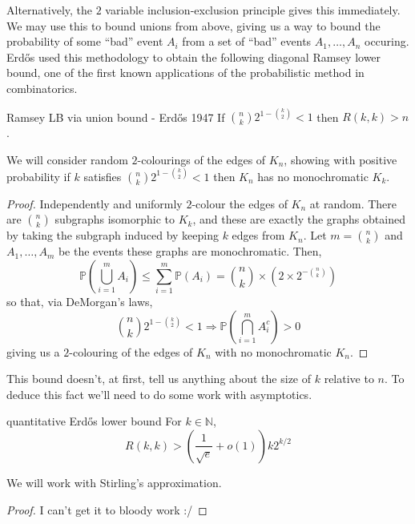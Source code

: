 \documentclass{article}
\begin{document}
Alternatively, the $2$ variable inclusion-exclusion principle gives this immediately. \\ 

We may use this to bound unions from above, giving us a way to bound the probability of some ``bad'' event 
$A_i$ from a set of ``bad'' events $A_1, \dots, A_n$ occuring. Erd\H{o}s used this methodology to obtain the 
following diagonal Ramsey lower bound, one of the first known applications of the probabilistic method in combinatorics. 

\begin{proposition}[]{Ramsey LB via union bound - Erd\H{o}s 1947}
    If $\binom{n}{k}2^{1 - \binom{k}{2}} < 1$ then $R(k, k) > n$. 
\end{proposition}

We will consider random $2$-colourings of the edges of $K_n$, showing with positive probability if 
$k$ satisfies $\binom{n}{k}2^{1 - \binom{k}{2}} < 1$ then $K_n$ has no monochromatic $K_k$. 

\begin{proof}
    Independently and uniformly $2$-colour the edges of $K_n$ at random. There are $\binom{n}{k}$ 
    subgraphs isomorphic to $K_k$, and these are exactly the graphs obtained by taking the subgraph induced by 
    keeping $k$ edges from $K_n$. Let $m = \binom{n}{k}$ and $A_1, \dots, A_{m}$ be the events these graphs are monochromatic. 
    Then, 
    \[\mathbb{P}\left(\bigcup_{i = 1}^{m}A_i\right) \leq \sum_{i = 1}^{m}\mathbb{P}(A_i) = 
    \binom{n}{k} \times (2 \times 2^{- \binom{n}{k}})\]
    so that, via DeMorgan's laws,
    \[\binom{n}{k}2^{1 - \binom{k}{2}} < 1 \Longrightarrow \mathbb{P}\left(\bigcap_{i = 1}^{m}A_i^c\right) > 0\]
    giving us a $2$-colouring of the edges of $K_n$ with no monochromatic $K_n$. 
\end{proof}

This bound doesn't, at first, tell us anything about the size of $k$ relative to $n$. To deduce this fact we'll 
need to do some work with asymptotics.

\begin{proposition}[]{quantitative Erd\H{o}s lower bound}
    For $k \in \mathbb{N}$, 
    \[R(k, k) > \left(\frac{1}{\sqrt{e}} + o(1)\right)k2^{k/2}\]
\end{proposition}

We will work with Stirling's approximation.

\begin{proof}
    I can't get it to bloody work :/
\end{proof}
\end{document}
